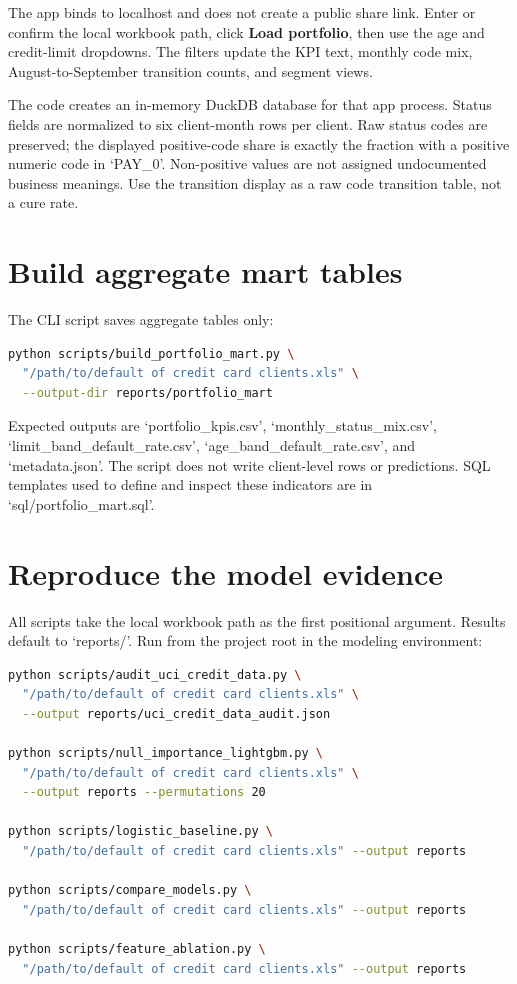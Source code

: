 \documentclass[11pt,letterpaper]{article}
\begin{document}
The app binds to localhost and does not create a public share link. Enter or confirm the local workbook path, click \textbf{Load portfolio}, then use the age and credit-limit dropdowns. The filters update the KPI text, monthly code mix, August-to-September transition counts, and segment views.

The code creates an in-memory DuckDB database for that app process. Status fields are normalized to six client-month rows per client. Raw status codes are preserved; the displayed positive-code share is exactly the fraction with a positive numeric code in `PAY\_0'. Non-positive values are not assigned undocumented business meanings. Use the transition display as a raw code transition table, not a cure rate.

\section{Build aggregate mart tables}
The CLI script saves aggregate tables only:

\begin{lstlisting}[language=bash]
python scripts/build_portfolio_mart.py \
  "/path/to/default of credit card clients.xls" \
  --output-dir reports/portfolio_mart
\end{lstlisting}

Expected outputs are `portfolio\_kpis.csv', `monthly\_status\_mix.csv', `limit\_band\_default\_rate.csv', `age\_band\_default\_rate.csv', and `metadata.json'. The script does not write client-level rows or predictions. SQL templates used to define and inspect these indicators are in `sql/portfolio\_mart.sql'.

\section{Reproduce the model evidence}
All scripts take the local workbook path as the first positional argument. Results default to `reports/'. Run from the project root in the modeling environment:

\begin{lstlisting}[language=bash]
python scripts/audit_uci_credit_data.py \
  "/path/to/default of credit card clients.xls" \
  --output reports/uci_credit_data_audit.json

python scripts/null_importance_lightgbm.py \
  "/path/to/default of credit card clients.xls" \
  --output reports --permutations 20

python scripts/logistic_baseline.py \
  "/path/to/default of credit card clients.xls" --output reports

python scripts/compare_models.py \
  "/path/to/default of credit card clients.xls" --output reports

python scripts/feature_ablation.py \
  "/path/to/default of credit card clients.xls" --output reports
\end{lstlisting}
\end{document}
